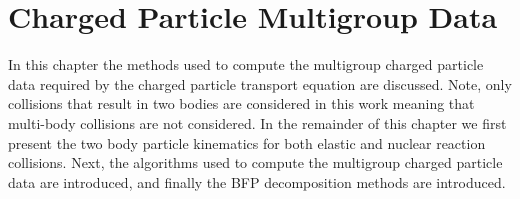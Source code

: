 \documentclass[../main.tex]{subfiles}
\begin{document}
\chapter{Charged Particle Multigroup Data}
In this chapter the methods used to compute the multigroup charged particle data required by the charged particle transport equation are discussed. Note, only collisions that result in two bodies are considered in this work meaning that multi-body collisions are not considered. In the remainder of this chapter we first present the two body particle kinematics for both elastic and nuclear reaction collisions. Next, the algorithms used to compute the multigroup charged particle data are introduced, and finally the BFP decomposition methods are introduced.






\end{document}
